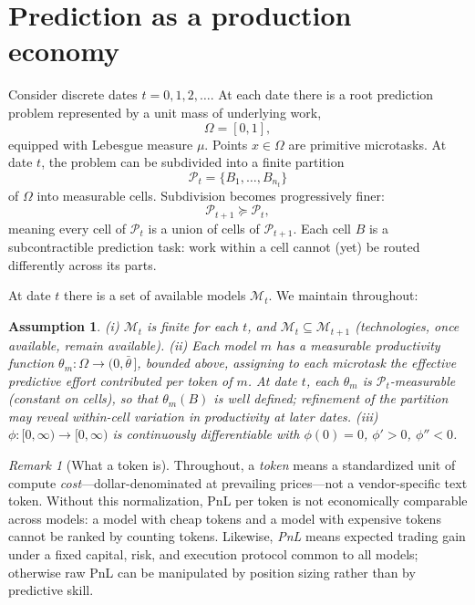 \documentclass[11pt]{article}
\newtheorem{assumption}{Assumption}
\theoremstyle{definition}
\theoremstyle{remark}
\newtheorem{remark}{Remark}
\begin{document}
\section{Prediction as a production economy}
\label{sec:economy}

Consider discrete dates $t = 0, 1, 2, \ldots$. At each date there is a root prediction problem represented by a unit mass of underlying work,
\begin{equation}
\Omega = [0,1],
\end{equation}
equipped with Lebesgue measure $\mu$. Points $x \in \Omega$ are primitive microtasks. At date $t$, the problem can be subdivided into a finite partition
\begin{equation}
\mathcal{P}_t = \{B_1, \ldots, B_{n_t}\}
\end{equation}
of $\Omega$ into measurable cells. Subdivision becomes progressively finer:
\begin{equation}
\mathcal{P}_{t+1} \succcurlyeq \mathcal{P}_t,
\end{equation}
meaning every cell of $\mathcal{P}_t$ is a union of cells of $\mathcal{P}_{t+1}$. Each cell $B$ is a subcontractible prediction task: work within a cell cannot (yet) be routed differently across its parts.

At date $t$ there is a set of available models $\mathcal{M}_t$. We maintain throughout:

\begin{assumption}
\label{ass:models}
(i) $\mathcal{M}_t$ is finite for each $t$, and $\mathcal{M}_t \subseteq \mathcal{M}_{t+1}$ (technologies, once available, remain available).
(ii) Each model $m$ has a measurable productivity function $\theta_m : \Omega \to (0, \bar\theta\,]$, bounded above, assigning to each microtask the \emph{effective predictive effort} contributed per token of $m$. At date $t$, each $\theta_m$ is $\mathcal{P}_t$-measurable (constant on cells), so that $\theta_m(B)$ is well defined; refinement of the partition may reveal within-cell variation in productivity at later dates.
(iii) $\phi : [0,\infty) \to [0,\infty)$ is continuously differentiable with $\phi(0) = 0$, $\phi' > 0$, $\phi'' < 0$.
\end{assumption}

\begin{remark}[What a token is]
\label{rem:token}
Throughout, a \emph{token} means a standardized unit of compute \emph{cost}---dollar-denominated at prevailing prices---not a vendor-specific text token. Without this normalization, PnL per token is not economically comparable across models: a model with cheap tokens and a model with expensive tokens cannot be ranked by counting tokens. Likewise, \emph{PnL} means expected trading gain under a fixed capital, risk, and execution protocol common to all models; otherwise raw PnL can be manipulated by position sizing rather than by predictive skill.
\end{remark}
\end{document}
